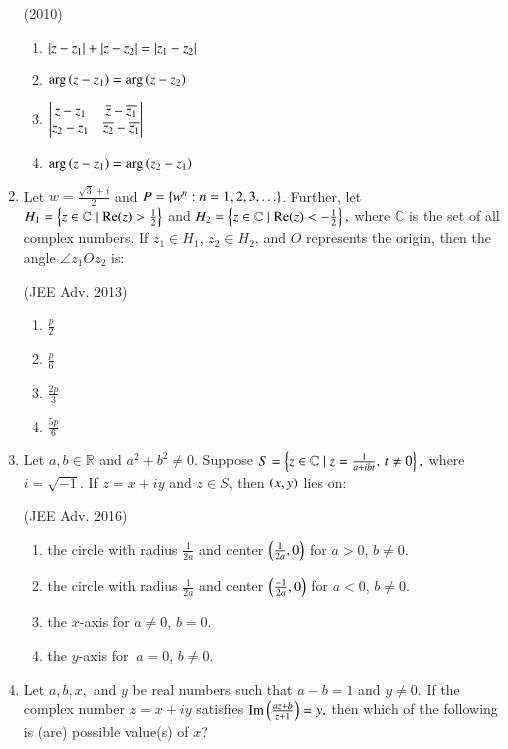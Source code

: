 \documentclass[journal,12pt,twocolumn]{IEEEtran}
\theoremstyle{remark}
\begin{document}
\begin{enumerate}
    \hfill (2010)
\begin{enumerate}[label=(\alph*)]
    \item $\left\vert z - z_1\right\vert + \left\vert z - z_2\right\vert = \left\vert z_1 - z_2\right\vert$
    \item $\mathrm{arg}\left(z - z_1\right) = \mathrm{arg}\left(z - z_2\right)$
    \item $\begin{vmatrix}z - z_1 & \overline{z} - \overline{z_1} \\z_2 - z_1 & \overline{z_2} - \overline{z_1}\end{vmatrix}$
    \item $\mathrm{arg}\left(z - z_1\right) = \mathrm{arg}\left(z_2 - z_1\right)$
\end{enumerate}
\item Let $ w = \frac{\sqrt{3} + i}{2} $ and $ P = \left\{w^n : n = 1, 2, 3, \ldots \right\} $. Further, let $H_1 = \left\{ z \in \mathbb{C} \mid \text{Re}(z) > \frac{1}{2} \right\}$ and $H_2 = \left\{ z \in \mathbb{C} \mid \text{Re}(z) < -\frac{1}{2} \right\},$
where $ \mathbb{C} $ is the set of all complex numbers. If $ z_1 \in H_1 $, $ z_2 \in H_2 $, and $ O $ represents the origin, then the angle $ \angle z_1Oz_2 $ is:

\hfill (JEE Adv. 2013)
\begin{multicols}{4}
    \begin{enumerate}[label=(\alph*)]
    \item $ \frac{p}{2} $
    \item $ \frac{p}{6} $
    \item $ \frac{2p}{3} $
    \item $ \frac{5p}{6} $
    \end{enumerate}
\end{multicols}
\item Let $ a, b \in \mathbb{R} $ and $ a^2 + b^2 \ne 0 $. Suppose $S = \left\{ z \in \mathbb{C} \mid z = \frac{1}{a + ibt}, \, t \ne 0 \right\},$
    where $ i = \sqrt{-1} $. If $ z = x + iy $ and $ z \in S $, then $\left(x, y\right)$ lies on:
    
    \hfill (JEE Adv. 2016)
    \begin{enumerate}[label=(\alph*)]
    \item the circle with radius $ \frac{1}{2a} $ and center $\left(\frac{1}{2a}, 0\right)$ for $ a > 0 $, $ b \ne 0 $.
    \item the circle with radius $ \frac{1}{2a} $ and center $\left(\frac{-1}{2a}, 0\right)$ for $ a < 0 $, $ b \ne 0 $.
    \item the $ x $-axis for $ a \ne 0 $, $ b = 0 $.
    \item the $ y $-axis for $\ a = 0 $, $ b \ne 0 $.
    \end{enumerate}
\item Let $ a, b, x, $ and $ y $ be real numbers such that $ a - b = 1 $ and $ y \ne 0 $. If the complex number $ z = x + iy $ satisfies $\text{Im}\left(\frac{az + b}{z + 1}\right) = y,$ then which of the following is (are) possible value(s) of $ x $? 


\end{enumerate}
\end{document}
